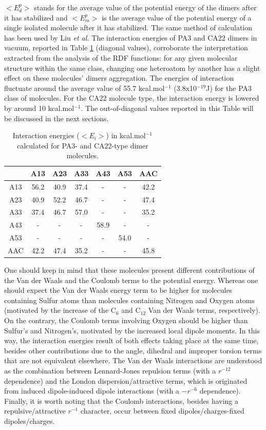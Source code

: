$<E^p_d>$ stands for the average value of the potential energy of the dimers after it has stabilized and $<E^p_m>$ is the average value of the potential energy of a single isolated molecule after it has stabilized. The same method of calculation has been used by Liu \textit{et al.}\cite{liu2015molecular} The interaction energies of PA3 and CA22 dimers in vacuum, reported in Table \ref{pap:tab02} (diagonal values), corroborate the interpretation extracted from the analysis of the RDF functions: for any given molecular structure within the same class, changing one heteroatom by another has a slight effect on these molecules' dimers aggregation. The energies of interaction fluctuate around the average value of 55.7 kcal.mol$^{-1}$ (3.8x10$^{-19}$J) for the PA3 class of molecules. For the CA22 molecule type, the interaction energy is lowered by around 10 kcal.mol$^{-1}$. The out-of-diagonal values reported in this Table will be discussed in the next sections.

\begin{table}[h]
	\centering
	\begin{tabular}{c|cccccc}
		\hline
		& A13 & A23 & A33 & A43 & A53 & AAC \\
		\hline         
		A13 & 56.2 & 40.9 & 37.4 & - & - & 42.2 \\        
		A23 & 40.9 & 52.2 & 46.7 & - & - & 47.4 \\
		A33 & 37.4 & 46.7 & 57.0 & - & - & 35.2 \\
		A43 & - & - & - & 58.9 & - & - \\
		A53 & - & - & - & - & 54.0 & - \\
		AAC & 42.2 & 47.4 & 35.2 & - & - & 45.8 \\
		\hline
	\end{tabular}
	\caption{Interaction energies ($<E_i>$) in kcal.mol$^{-1}$ calculated for PA3- and CA22-type dimer molecules.}
	\label{pap:tab02}
\end{table}

One should keep in mind that these molecules present different contributions of the Van der Waals and the Coulomb terms to the potential energy. Whereas one should expect the Van der Waals energy term to be higher for molecules containing Sulfur atoms than molecules containing Nitrogen and Oxygen atoms (motivated by the increase of the C$_6$ and C$_{12}$ Van der Waals terms, respectively). On the contrary, the Coulomb terms involving Oxygen should be higher than Sulfur's and Nitrogen's, motivated by the increased local dipole moments. In this way, the interaction energies result of both effects taking place at the same time, besides other contributions due to the angle, dihedral and improper torsion terms that are not equivalent elsewhere. The Van der Waals interactions are understood as the combination between Lennard-Jones repulsion terms (with a $r^{-12}$ dependence) and the London dispersion/attractive terms, which is originated from induced dipole-induced dipole interactions (with a $-r^{-6}$ dependence). Finally, it is worth noting that the Coulomb interactions, besides having a repulsive/attractive $r^{-1}$ character, occur between fixed dipoles/charges-fixed dipoles/charges.\\


